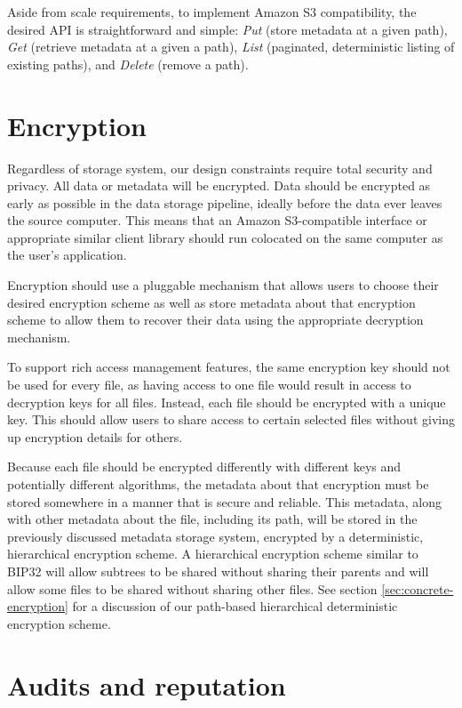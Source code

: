 \documentclass[8pt,fleqn,openany]{book}
\begin{document}
Aside from scale requirements, to implement Amazon S3 compatibility,
the desired API is straightforward and
simple: {\em Put} (store metadata at a given path), {\em Get} (retrieve metadata at a
given a path),
{\em List} (paginated, deterministic listing of existing paths), and {\em Delete}
(remove a path).

\section{Encryption}

Regardless of storage system, our design constraints require total security
and privacy. All data or metadata will be encrypted.
Data should be encrypted as early as possible in the data storage pipeline,
ideally before the data ever leaves the source computer. This means that an
Amazon S3-compatible interface or appropriate similar client library should run
colocated on the same computer as the user's application.

Encryption should use a pluggable mechanism that allows users to choose their
desired encryption scheme as well as store metadata about that encryption
scheme to allow them to recover their data using the appropriate decryption
mechanism.

To support rich access management features, the same encryption key should not
be used for every file, as having access to one file would result in access
to decryption keys for all files. Instead, each file should be encrypted with
a unique key. This should allow users to share access to certain selected files
without giving up encryption details for others.

Because each file should be encrypted differently with different keys and
potentially different algorithms, the metadata about that encryption must
be stored somewhere in a manner that is secure and reliable. This metadata,
along with other metadata about the file, including its path, will
be stored in the previously discussed metadata storage system, encrypted
by a deterministic, hierarchical encryption scheme.
A hierarchical encryption scheme similar to
BIP32 \cite{bip32} will allow subtrees to be shared without sharing their
parents and will allow some files to be shared without sharing other files.
See section \ref{sec:concrete-encryption} for a discussion of our path-based
hierarchical deterministic encryption scheme.

\section{Audits and reputation}\label{sec:framework-audits}
\end{document}
